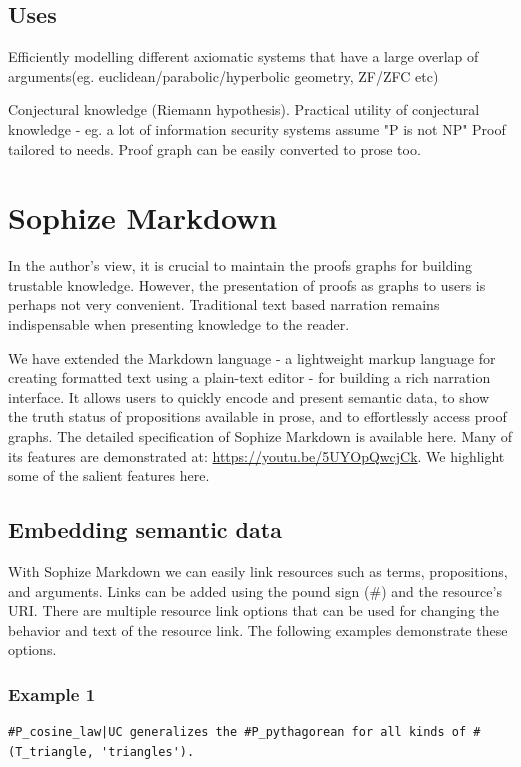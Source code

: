 \documentclass[a4paper]{article}
\begin{document}
\subsection{Uses}
Efficiently modelling different axiomatic systems that have a large overlap of arguments(eg. euclidean/parabolic/hyperbolic geometry, ZF/ZFC etc)

Conjectural knowledge (Riemann hypothesis). 
Practical utility of conjectural knowledge - eg. a lot of information security systems assume "P is not NP"
Proof tailored to needs. Proof graph can be easily converted to prose too.


\section{Sophize Markdown}

In the author's view, it is crucial to maintain the proofs graphs for building trustable knowledge. However, the presentation of proofs as graphs to users is perhaps not very convenient. Traditional text based narration remains indispensable when presenting knowledge to the reader.

We have extended the Markdown language - a lightweight markup language for creating formatted text using a plain-text editor - for building a rich narration interface. It allows users to quickly encode and present semantic data, to show the truth status of propositions available in prose, and to effortlessly access proof graphs. The detailed specification of Sophize Markdown is available here. Many of its features are demonstrated at: \url{https://youtu.be/5UYOpQwcjCk}. We highlight some of the salient features here.

\subsection{Embedding semantic data}

With Sophize Markdown we can easily link resources such as terms, propositions, and arguments. Links can be added using the pound sign (\#) and the resource's URI. There are multiple resource link options that can be used for changing the behavior and text of the resource link. The following examples demonstrate these options.

\subsubsection*{Example 1}
\begin{verbatim}
#P_cosine_law|UC generalizes the #P_pythagorean for all kinds of #(T_triangle, 'triangles').
\end{verbatim}
\end{document}
